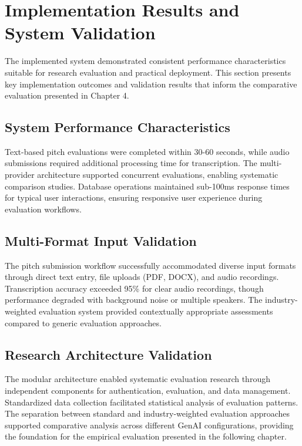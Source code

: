 \section{Implementation Results and System Validation}
\label{sec:results}

The implemented system demonstrated consistent performance characteristics suitable for research evaluation and practical deployment. This section presents key implementation outcomes and validation results that inform the comparative evaluation presented in Chapter 4.

\subsection{System Performance Characteristics}
\label{subsec:performance}

Text-based pitch evaluations were completed within 30-60 seconds, while audio submissions required additional processing time for transcription. The multi-provider architecture supported concurrent evaluations, enabling systematic comparison studies. Database operations maintained sub-100ms response times for typical user interactions, ensuring responsive user experience during evaluation workflows.

\subsection{Multi-Format Input Validation}
\label{subsec:input-validation}

The pitch submission workflow successfully accommodated diverse input formats through direct text entry, file uploads (PDF, DOCX), and audio recordings. Transcription accuracy exceeded 95\% for clear audio recordings, though performance degraded with background noise or multiple speakers. The industry-weighted evaluation system provided contextually appropriate assessments compared to generic evaluation approaches.

\subsection{Research Architecture Validation}
\label{subsec:research-validation}

The modular architecture enabled systematic evaluation research through independent components for authentication, evaluation, and data management. Standardized data collection facilitated statistical analysis of evaluation patterns. The separation between standard and industry-weighted evaluation approaches supported comparative analysis across different GenAI configurations, providing the foundation for the empirical evaluation presented in the following chapter.
